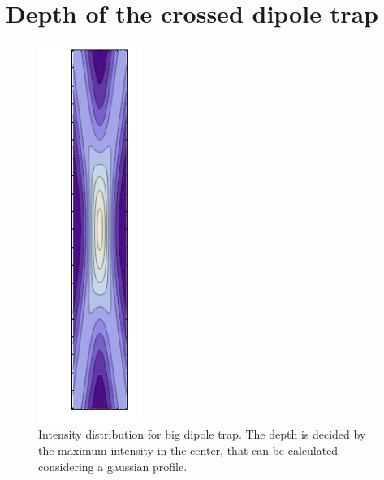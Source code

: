 \section{Depth of the crossed dipole trap}
\begin{figure}[H]
\centering
 \includegraphics[width=0.3\textwidth,angle=90]{crossed_dipole_trap}

\caption{Intensity distribution for big dipole trap. The depth is decided by the maximum intensity in the center, that can be calculated considering a gaussian profile.}
\label{dipolegraphic}
\end{figure}

